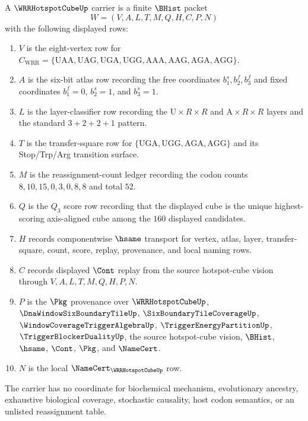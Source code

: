 \begin{definition}
\label{def:wrr-hotspot-cube-carrier}
A $\WRRHotspotCubeUp$ carrier is a finite $\BHist$ packet
$$
W=(V,A,L,T,M,Q,H,C,P,N)
$$
with the following displayed rows:
\begin{enumerate}
\item $V$ is the eight-vertex row for $C_{\mathrm{WRR}}=\{\mathrm{UAA},\mathrm{UAG},\mathrm{UGA},\mathrm{UGG},\mathrm{AAA},\mathrm{AAG},\mathrm{AGA},\mathrm{AGG}\}$.
\item $A$ is the six-bit atlas row recording the free coordinates $b_{1}^{s},b_{2}^{f},b_{3}^{f}$ and fixed coordinates $b_{1}^{f}=0$, $b_{2}^{s}=1$, and $b_{3}^{s}=1$.
\item $L$ is the layer-classifier row recording the $\mathrm{U}\times R\times R$ and $\mathrm{A}\times R\times R$ layers and the standard $3+2+2+1$ pattern.
\item $T$ is the transfer-square row for $\{\mathrm{UGA},\mathrm{UGG},\mathrm{AGA},\mathrm{AGG}\}$ and its Stop/Trp/Arg transition surface.
\item $M$ is the reassignment-count ledger recording the codon counts $8,10,15,0,3,0,8,8$ and total $52$.
\item $Q$ is the $Q_{3}$ score row recording that the displayed cube is the unique highest-scoring axis-aligned cube among the $160$ displayed candidates.
\item $H$ records componentwise $\hsame$ transport for vertex, atlas, layer, transfer-square, count, score, replay, provenance, and local naming rows.
\item $C$ records displayed $\Cont$ replay from the source hotspot-cube vision through $V,A,L,T,M,Q,H,P,N$.
\item $P$ is the $\Pkg$ provenance over $\WRRHotspotCubeUp$, $\DnaWindowSixBoundaryTileUp$, $\SixBoundaryTileCoverageUp$, $\WindowCoverageTriggerAlgebraUp$, $\TriggerEnergyPartitionUp$, $\TriggerBlockerDualityUp$, the source hotspot-cube vision, $\BHist$, $\hsame$, $\Cont$, $\Pkg$, and $\NameCert$.
\item $N$ is the local $\NameCert_{\WRRHotspotCubeUp}$ row.
\end{enumerate}
The carrier has no coordinate for biochemical mechanism, evolutionary ancestry, exhaustive biological coverage, stochastic causality, host codon semantics, or an unlisted reassignment table.
\end{definition}

